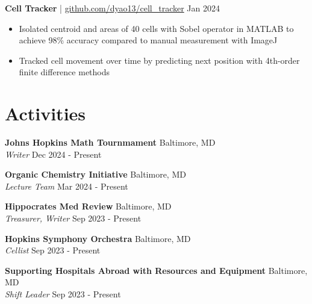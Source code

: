 \documentclass[11pt]{article}       %
\begin{document}
\textbf{Cell Tracker} | \href{https://github.com/dyao13/cell_tracker}{github.com/dyao13/cell\_tracker} \hfill Jan 2024 \vspace{-9pt} \\
\begin{itemize}
  \item Isolated centroid and areas of 40 cells with Sobel operator in MATLAB to achieve 98\% accuracy compared to manual measurement with ImageJ
  \item Tracked cell movement over time by predicting next position with 4th-order finite difference methods
\end{itemize}

\vspace{-18.5pt}

\section*{Activities}

\textbf{Johns Hopkins Math Tournmament} \hfill Baltimore, MD \\
\textit{Writer} \hfill Dec 2024 - Present \\

\vspace{5pt}

\textbf{Organic Chemistry Initiative} \hfill Baltimore, MD \\
\textit{Lecture Team} \hfill Mar 2024 - Present \\

\vspace{5pt}

\textbf{Hippocrates Med Review} \hfill Baltimore, MD \\
\textit{Treasurer, Writer} \hfill Sep 2023 - Present \\

\vspace{5pt}

\textbf{Hopkins Symphony Orchestra} \hfill Baltimore, MD \\
\textit{Cellist} \hfill Sep 2023 - Present \\

\vspace{5pt}

\textbf{Supporting Hospitals Abroad with Resources and Equipment} \hfill Baltimore, MD \\
\textit{Shift Leader} \hfill Sep 2023 - Present \\

\vspace{-9pt}
\end{document}
